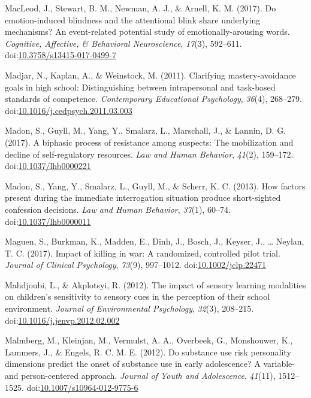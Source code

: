 \documentclass[english,man]{apa6}
\begin{document}
\hypertarget{ref-MacLeod2017}{}
MacLeod, J., Stewart, B. M., Newman, A. J., \& Arnell, K. M. (2017). Do
emotion-induced blindness and the attentional blink share underlying
mechanisms? An event-related potential study of emotionally-arousing
words. \emph{Cognitive, Affective, \& Behavioral Neuroscience},
\emph{17}(3), 592--611.
doi:\href{https://doi.org/10.3758/s13415-017-0499-7}{10.3758/s13415-017-0499-7}

\hypertarget{ref-Madjar2011}{}
Madjar, N., Kaplan, A., \& Weinstock, M. (2011). Clarifying
mastery-avoidance goals in high school: Distinguishing between
intrapersonal and task-based standards of competence. \emph{Contemporary
Educational Psychology}, \emph{36}(4), 268--279.
doi:\href{https://doi.org/10.1016/j.cedpsych.2011.03.003}{10.1016/j.cedpsych.2011.03.003}

\hypertarget{ref-Madon2017}{}
Madon, S., Guyll, M., Yang, Y., Smalarz, L., Marschall, J., \& Lannin,
D. G. (2017). A biphasic process of resistance among suspects: The
mobilization and decline of self-regulatory resources. \emph{Law and
Human Behavior}, \emph{41}(2), 159--172.
doi:\href{https://doi.org/10.1037/lhb0000221}{10.1037/lhb0000221}

\hypertarget{ref-Madon2013}{}
Madon, S., Yang, Y., Smalarz, L., Guyll, M., \& Scherr, K. C. (2013).
How factors present during the immediate interrogation situation produce
short-sighted confession decisions. \emph{Law and Human Behavior},
\emph{37}(1), 60--74.
doi:\href{https://doi.org/10.1037/lhb0000011}{10.1037/lhb0000011}

\hypertarget{ref-Maguen2017}{}
Maguen, S., Burkman, K., Madden, E., Dinh, J., Bosch, J., Keyser, J.,
\ldots{} Neylan, T. C. (2017). Impact of killing in war: A randomized,
controlled pilot trial. \emph{Journal of Clinical Psychology},
\emph{73}(9), 997--1012.
doi:\href{https://doi.org/10.1002/jclp.22471}{10.1002/jclp.22471}

\hypertarget{ref-Mahdjoubi2012}{}
Mahdjoubi, L., \& Akplotsyi, R. (2012). The impact of sensory learning
modalities on children's sensitivity to sensory cues in the perception
of their school environment. \emph{Journal of Environmental Psychology},
\emph{32}(3), 208--215.
doi:\href{https://doi.org/10.1016/j.jenvp.2012.02.002}{10.1016/j.jenvp.2012.02.002}

\hypertarget{ref-Malmberg2012}{}
Malmberg, M., Kleinjan, M., Vermulst, A. A., Overbeek, G., Monshouwer,
K., Lammers, J., \& Engels, R. C. M. E. (2012). Do substance use risk
personality dimensions predict the onset of substance use in early
adolescence? A variable- and person-centered approach. \emph{Journal of
Youth and Adolescence}, \emph{41}(11), 1512--1525.
doi:\href{https://doi.org/10.1007/s10964-012-9775-6}{10.1007/s10964-012-9775-6}
\end{document}
